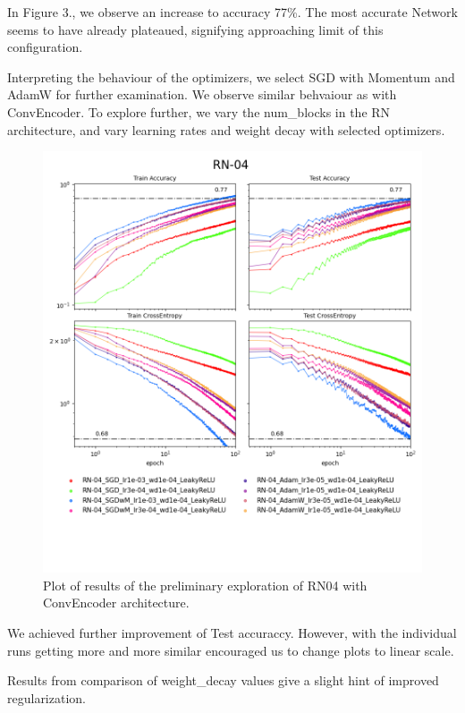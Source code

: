 \documentclass[12pt,a4paper]{article}
\begin{document}
In Figure 3., we observe an increase to accuracy 77\%. The most accurate
Network seems to have already plateaued, signifying approaching limit
of this configuration.

Interpreting the behaviour of the optimizers, we select SGD with Momentum
and AdamW for further examination. We observe similar behvaiour as with
ConvEncoder. To explore further, we vary the num\_blocks in the RN
architecture, and vary learning rates and weight decay with selected
optimizers.

\begin{figure}[H]
  \includegraphics[width=\textwidth, trim={0, 3.5cm, 0, 0}, clip]{../logsRN-04.png}
  \caption{Plot of results of the preliminary exploration of RN04 with ConvEncoder
  architecture.}
\end{figure}

We achieved further improvement of Test accuraccy. However, with the
individual runs getting more and more similar encouraged us to change
plots to linear scale.

Results from comparison of weight\_decay values give a slight hint
of improved regularization.
\end{document}
